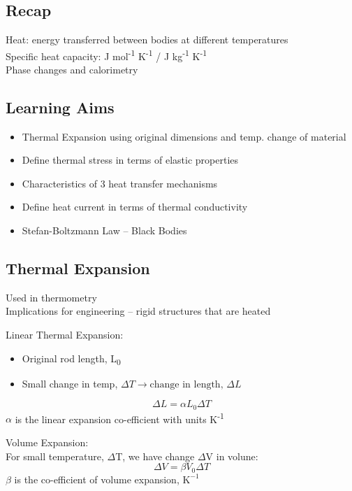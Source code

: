 \documentclass[a4paper, 11pt, fleqn, normalem]{report}
\begin{document}
\chapter{}
\thispagestyle{fancy}
\section{Recap}
Heat: energy transferred between bodies at different temperatures \\
Specific heat capacity: J mol\textsuperscript{-1} K\textsuperscript{-1} / J kg\textsuperscript{-1} K\textsuperscript{-1} \\
Phase changes and calorimetry

\section{Learning Aims}
\begin{itemize}
    \item Thermal Expansion using original dimensions and temp. change of material
    \item Define thermal stress in terms of elastic properties
    \item Characteristics of 3 heat transfer mechanisms
    \item Define heat current in terms of thermal conductivity
    \item Stefan-Boltzmann Law -- Black Bodies
\end{itemize}

\section{Thermal Expansion}
Used in thermometry \\
Implications for engineering -- rigid structures that are heated

Linear Thermal Expansion:
\begin{itemize}
    \item Original rod length, L\textsubscript{0}
    \item Small change in temp, ${\Delta}T \rightarrow \text{change in length, } {\Delta}L$
\end{itemize}
\begin{equation*}
    {\Delta}L = {\alpha}L_{0}{\Delta}T
\end{equation*}
$\alpha$ is the linear expansion co-efficient with units K\textsuperscript{-1}

Volume Expansion:\\
For small temperature, $\Delta$T, we have change $\Delta$V in volune:
\begin{equation*}
    {\Delta}V = {\beta}V_{0}{\Delta}T
\end{equation*}
$\beta$ is the co-efficient of volume expansion, $\text{K}^{-1}$
\end{document}
